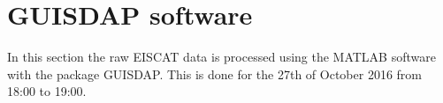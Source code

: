 
\section{GUISDAP software}
In this section the raw EISCAT data is processed using the MATLAB software with the package GUISDAP. This is done for the 27th of October 2016 from 18:00 to 19:00. 